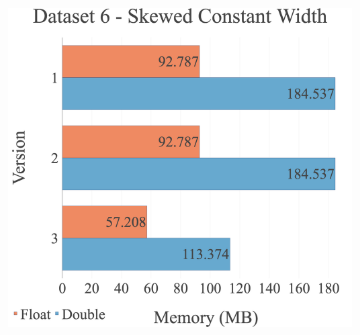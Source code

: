 \begin{figure}[H]
\begin{adjustwidth}{-2cm}{-2cm}
\begin{subfigure}{.62\textwidth}
\end{subfigure}
\par\bigskip
\par\bigskip
\centering
\begin{subfigure}{.62\textwidth}
  \includegraphics[width=1\textwidth]{img/experiments/mem-multi-versions-6_SKEWEDCONSTWIDTH.png}
\end{subfigure}
\end{adjustwidth}
\end{figure}

